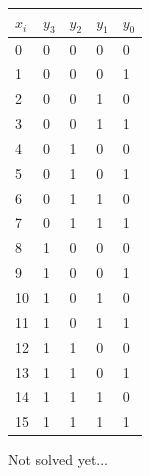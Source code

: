 \documentclass[10pt,a4paper]{scrartcl}
\begin{document}
\begin{tabular}{|l||l|l|l|l|}\hline
$x_i$ & $y_3$ & $y_2$ & $y_1$ & $y_0$ \\\hline\hline
0 & 0 & 0 & 0 & 0  \\\hline
1 & 0 & 0 & 0 & 1  \\\hline
2 & 0 & 0 & 1 & 0  \\\hline
3 & 0 & 0 & 1 & 1  \\\hline
4 & 0 & 1 & 0 & 0  \\\hline
5 & 0 & 1 & 0 & 1  \\\hline
6 & 0 & 1 & 1 & 0  \\\hline
7 & 0 & 1 & 1 & 1  \\\hline
8 & 1 & 0 & 0 & 0  \\\hline
9 & 1 & 0 & 0 & 1  \\\hline
10 & 1 & 0 & 1 & 0 \\\hline
11 & 1 & 0 & 1 & 1 \\\hline
12 & 1 & 1 & 0 & 0 \\\hline
13 & 1 & 1 & 0 & 1 \\\hline
14 & 1 & 1 & 1 & 0 \\\hline
15 & 1 & 1 & 1 & 1 \\\hline
\end{tabular}
Not solved yet...
\end{document}
